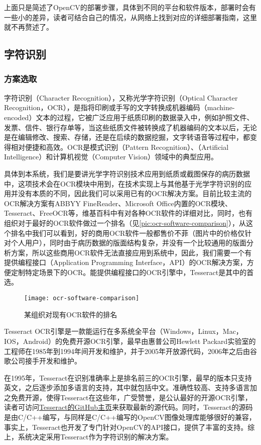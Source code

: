 上面只是简述了OpenCV的部署步骤，具体到不同的平台和软件版本，部署时会有一些小的差异，读者可结合自己的情况，从网络上找到对应的详细部署指南，这里就不再赘述了。

\subsection{字符识别}
\subsubsection*{方案选取}
字符识别（Character Recognition），又称光学字符识别（Optical Character Recognition，OCR），是指将印刷或手写的文字转换成机器编码（machine-encoded）文本的过程，它被广泛应用于纸质印刷的数据录入中，例如护照文件、发票、信件、银行存单等，当这些纸质文件被转换成了机器编码的文本以后，无论是在编辑修改、搜索、存储，还是在后续的数据挖掘，文字转语音等过程中，都变得相对便捷和高效。OCR是模式识别（Pattern Recognition）、（Artificial Intelligence）和计算机视觉（Computer Vision）领域中的典型应用\citep{wiki:OCR}。

具体到本系统，我们是要讲光学字符识别技术应用到纸质或截图保存的病历数据中，这项技术会在OCR模块中用到，在技术实现上与其他基于光学字符识别的应用并没有本质的不同，因此我们可以采用已有的OCR解决方案。目前比较主流的OCR解决方案有ABBYY FineReader、Microsoft Office内置的OCR模块、Tesseract、FreeOCR等，维基百科中有对各种OCR软件的详细对比\citep{wiki:OCRcomparison}，同时，也有组织对于最好的OCR软件做过一个排名（见\autoref{pic:ocr-software-comparison}），从这个排名中我们可以看到，好的商用OCR软件一般都售价不菲（图片中的价格仅针对个人用户），同时由于病历数据的版面结构复杂，并没有一个比较通用的版面分析方案，所以这些商用OCR软件无法直接应用到系统中，因此，我们需要一个有提供编程接口（Application Programming Interface，API）的OCR解决方案，方便定制特定场景下的OCR。能提供编程接口的OCR引擎中，Tesseract是其中的首选。

\begin{figure}
	\centering
	\texttt{[image: ocr-software-comparison]}
	\caption{某组织对现有OCR软件的排名}
	\label{pic:ocr-software-comparison}
\end{figure}

Tesseract OCR引擎是一款能运行在多系统全平台（Windows，Linux，Mac，IOS，Android）的免费开源OCR引擎，最早由惠普公司Hewlett Packard实验室的工程师在1985年到1994年间开发和维护，并于2005年开放源代码，2006年之后由谷歌公司接手开发和维护\citep{wiki:Tesseract}。

在1995年，Tesseract在识别准确率上是排名前三的OCR引擎，最早的版本只支持英文，之后逐步添加多语言的支持，其中就包括中文。准确性较高、支持多语言加之免费开源，使得Tesseract在这些年，广受赞誉，是公认最好的开源OCR引擎，读者可访问\href{https://github.com/tesseract-ocr/tesseract}{Tesseract的GitHub主页}来获取最新的源代码。同时，Tesseract的源码是由C/C++编写，与同样是C/C++编写的OpenCV图像处理库能够很好的兼容，事实上，Tesseract也开发了专门针对OpenCV的API接口，提供了丰富的支持。综上，系统决定采用Tesseract作为字符识别的解决方案。

